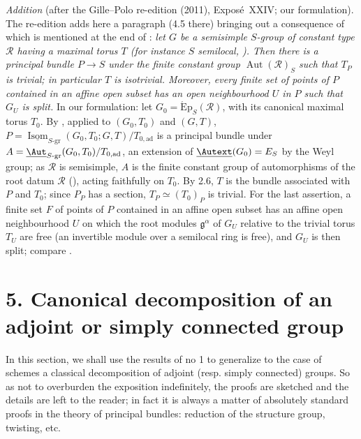 \medskip\noindent
\emph{Addition} (after the Gille--Polo re-edition (2011), Exposé~XXIV; our formulation). The re-edition adds here a paragraph (4.5 there) bringing out
a consequence of  which is mentioned at the end of
: \emph{let \(G\) be a semisimple \(S\)-group of
constant type \(\mathscr R\) having a maximal torus \(T\) \textup{(}for instance \(S\) semilocal,
\textup{)}. Then there is a principal bundle \(P\to S\) under the
finite constant group \(\operatorname{Aut}(\mathscr R)_S\) such that \(T_P\) is trivial; in
particular \(T\) is isotrivial. Moreover, every finite set of points of \(P\) contained in an affine
open subset has an open neighbourhood \(U\) in \(P\) such that \(G_U\) is split.} In our formulation:
let \(G_0=\operatorname{\acute{E}p}_S(\mathscr R)\), with its canonical maximal torus \(T_0\). By
, applied to \((G_0,T_0)\) and \((G,T)\),
\(P=\underline{\operatorname{Isom}}_{S\text{-}\mathrm{gr}}(G_0,T_0;G,T)/T_{0,\mathrm{ad}}\) is a
principal bundle under \(A=\underline{\Aut}_{S\text{-}\mathrm{gr}}(G_0,T_0)/T_{0,\mathrm{ad}}\), an
extension of \(\underline{\Autext}(G_0)=E_S\) by the Weyl group; as \(\mathscr R\) is semisimple,
\(A\) is the finite constant group of automorphisms of the root datum \(\mathscr R\)
\textup{()}, acting faithfully on \(T_0\). By 2.6, \(T\) is the
bundle associated with \(P\) and \(T_0\); since \(P_P\) has a section, \(T_P\simeq(T_0)_P\) is
trivial. For the last assertion, a finite set \(F\) of points of \(P\) contained in an affine open
subset has an affine open neighbourhood \(U\) on which the root modules \(\mathfrak g^\alpha\) of
\(G_U\) relative to the trivial torus \(T_U\) are free (an invertible module over a semilocal ring
is free), and \(G_U\) is then split; compare .

\section*{5. Canonical decomposition of an adjoint or simply connected group}

In this section, we shall use the results of no 1 to generalize to the case of schemes a classical decomposition of
adjoint (resp. simply connected) groups. So as not to overburden the exposition indefinitely, the proofs are sketched
and the details are left to the reader; in fact it is always a matter of absolutely standard proofs in the theory of
principal bundles: reduction of the structure group, twisting, etc.

